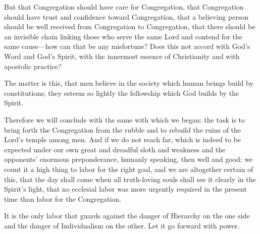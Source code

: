 But that Congregation should have care for Congregation, that Congregation should have trust and confidence toward Congregation, that a believing person should be well received from Congregation to Congregation, that there should be an invisible chain linking those who serve the same Lord and contend for the same cause—how can that be any misfortune? Does this not accord with God’s Word and God’s Spirit, with the innermost essence of Christianity and with apostolic practice?

The matter is this, that men believe in the society which human beings build by constitutions; they esteem so lightly the fellowship which God builds by the Spirit.

Therefore we will conclude with the same with which we began: the task is to bring forth the Congregation from the rubble and to rebuild the ruins of the Lord’s temple among men. And if we do not reach far, which is indeed to be expected under our own great and dreadful sloth and weakness and the opponents’ enormous preponderance, humanly speaking, then well and good: we count it a high thing to labor for the right goal, and we are altogether certain of this, that the day shall come when all truth-loving souls shall see it clearly in the Spirit’s light, that no ecclesial labor was more urgently required in the present time than labor for the Congregation.

It is the only labor that guards against the danger of Hierarchy on the one side and the danger of Individualism on the other. Let it go forward with power.


